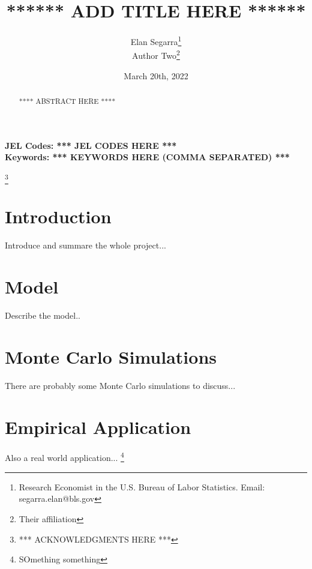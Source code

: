 \documentclass[11pt, letterpaper]{article}
\begin{document}
\begin{titlepage}

\title{****** ADD TITLE HERE ******}
\author{Elan Segarra\footnote{Research Economist in the U.S. Bureau of Labor Statistics. Email: segarra.elan@bls.gov}\\ Author Two\footnote{Their affiliation}}
\date{March 20th, 2022}
\maketitle

\begin{center}
	\href{html_to_most_recent_draft}{\color{cyan}{Link to most recent version}}
\end{center}

\bigskip

\begin{abstract}
	**** ABSTRACT HERE ****
\end{abstract}

\vfill
\noindent\small{\textbf{JEL Codes: *** JEL CODES HERE ***}}\\
\small{\textbf{Keywords: *** KEYWORDS HERE (COMMA SEPARATED) *** }}

\thanks{*** ACKNOWLEDGMENTS HERE ***}

\end{titlepage}

\newpage

\section{Introduction}\label{sec:intro}

Introduce and summare the whole project...
 
\section{Model}\label{sec:model}
Describe the model..

\section{Monte Carlo Simulations}\label{sec:mc_sims}
There are probably some Monte Carlo simulations to discuss...

\section{Empirical Application}\label{sec:application}
Also a real world application... \footnote{SOmething something}
\end{document}
